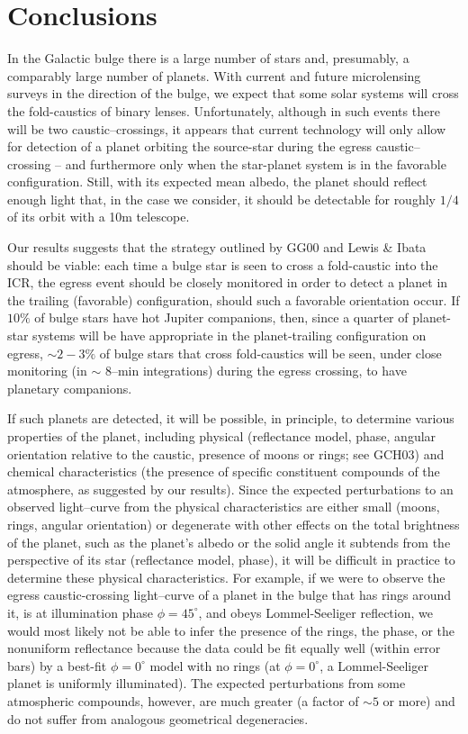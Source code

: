 \section{Conclusions}
\label{micro_sec:conc}
In the Galactic bulge there is a large number of stars and,
presumably, a comparably large number of planets.  With current and
future microlensing surveys in the direction of the bulge, we expect
that some solar systems will cross the fold-caustics of binary lenses.
Unfortunately, although in such events there will be two
caustic--crossings, it appears that current technology will only allow
for detection of a planet orbiting the source-star during the egress
caustic--crossing -- and furthermore only when the star-planet system
is in the favorable configuration.  Still, with its expected mean
albedo, the planet should reflect enough light that, in the case we
consider, it should be detectable for roughly $1/4$ of its orbit with
a 10m telescope.

Our results suggests that the strategy outlined by GG00 and Lewis \&
Ibata should be viable: each time a bulge star is seen to cross a
fold-caustic into the ICR, the egress event should be closely
monitored in order to detect a planet in the trailing (favorable)
configuration, should such a favorable orientation occur.  If $10\%$
of bulge stars have hot Jupiter companions, then, since a quarter of
planet-star systems will be have appropriate in the planet-trailing
configuration on egress, $\sim2-3\%$ of bulge stars that cross
fold-caustics will be seen, under close monitoring (in $\sim$ 8--min
integrations) during the egress crossing, to have planetary
companions.

If such planets are detected, it will be possible, in principle, to
determine various properties of the planet, including physical
(reflectance model, phase, angular orientation relative to the
caustic, presence of moons or rings; see GCH03) and chemical
characteristics (the presence of specific constituent compounds of the
atmosphere, as suggested by our results). Since the expected
perturbations to an observed light--curve from the physical
characteristics are either small (moons, rings, angular orientation)
or degenerate with other effects on the total brightness of the
planet, such as the planet's albedo or the solid angle it subtends
from the perspective of its star (reflectance model, phase), it will
be difficult in practice to determine these physical characteristics.
For example, if we were to observe the egress caustic-crossing light--curve of
a planet in the bulge that has rings around it, is at illumination phase
$\phi=45^\circ$, and obeys Lommel-Seeliger reflection, we would most likely
not be able to infer the presence of the rings, the phase, or the
nonuniform reflectance because the data could be fit
equally well (within error bars) by a best-fit $\phi=0^\circ$ model with no 
rings (at $\phi=0^\circ$, a Lommel-Seeliger planet is uniformly illuminated).
The expected perturbations from some atmospheric compounds, however,
are much greater (a factor of $\sim5$ or more) and do not suffer from
analogous geometrical degeneracies.  

